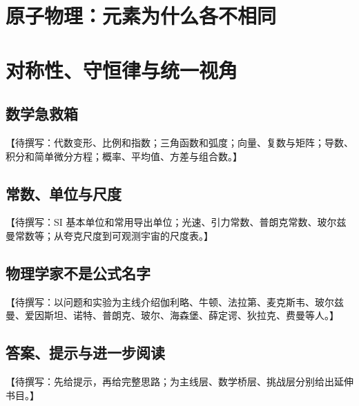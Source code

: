 \documentclass[fontset=fandol,12pt,openany]{ctexbook}
\begin{document}
\part{原子物理：元素为什么各不相同}






\part{对称性、守恒律与统一视角}






\backmatter
\chapter{数学急救箱}
【待撰写：代数变形、比例和指数；三角函数和弧度；向量、复数与矩阵；导数、积分和简单微分方程；概率、平均值、方差与组合数。】
\chapter{常数、单位与尺度}
【待撰写：SI 基本单位和常用导出单位；光速、引力常数、普朗克常数、玻尔兹曼常数等；从夸克尺度到可观测宇宙的尺度表。】
\chapter{物理学家不是公式名字}
【待撰写：以问题和实验为主线介绍伽利略、牛顿、法拉第、麦克斯韦、玻尔兹曼、爱因斯坦、诺特、普朗克、玻尔、海森堡、薛定谔、狄拉克、费曼等人。】
\chapter{答案、提示与进一步阅读}
【待撰写：先给提示，再给完整思路；为主线层、数学桥层、挑战层分别给出延伸书目。】
\end{document}
